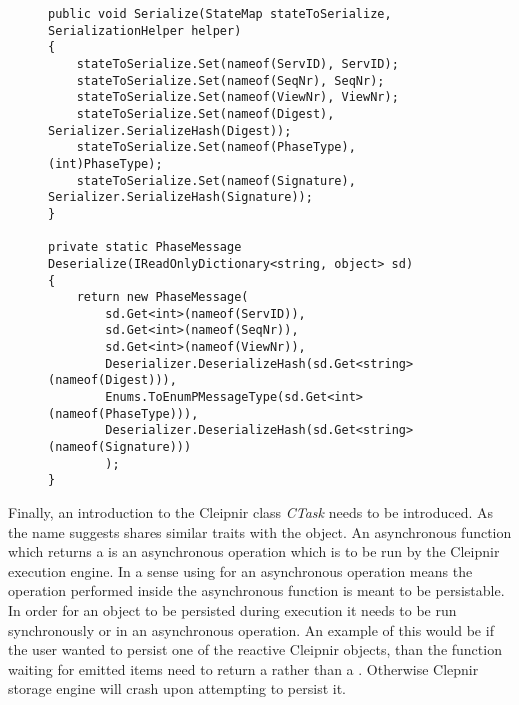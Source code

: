 \begin{figure}[H]
	\centering
	\begin{lstlisting}[label = code:seriadeseria, caption=Serialize/Deserialize code example, captionpos=b, basicstyle=\scriptsize]
public void Serialize(StateMap stateToSerialize, SerializationHelper helper)
{
    stateToSerialize.Set(nameof(ServID), ServID);
    stateToSerialize.Set(nameof(SeqNr), SeqNr);
    stateToSerialize.Set(nameof(ViewNr), ViewNr);
    stateToSerialize.Set(nameof(Digest), Serializer.SerializeHash(Digest));
    stateToSerialize.Set(nameof(PhaseType), (int)PhaseType);
    stateToSerialize.Set(nameof(Signature), Serializer.SerializeHash(Signature));
}

private static PhaseMessage Deserialize(IReadOnlyDictionary<string, object> sd)
{
    return new PhaseMessage(
        sd.Get<int>(nameof(ServID)),
        sd.Get<int>(nameof(SeqNr)),
        sd.Get<int>(nameof(ViewNr)),
        Deserializer.DeserializeHash(sd.Get<string>(nameof(Digest))),
        Enums.ToEnumPMessageType(sd.Get<int>(nameof(PhaseType))),
        Deserializer.DeserializeHash(sd.Get<string>(nameof(Signature)))
        );
}
	\end{lstlisting}
\end{figure}

Finally, an introduction to the Cleipnir class \emph{CTask} needs to be introduced. As the name suggests  shares similar traits with the  object. An asynchronous function which returns a  is an asynchronous operation which is to be run by the Cleipnir execution engine. In a sense using  for an asynchronous operation means the operation performed inside the asynchronous function is meant to be persistable. In order for an object to be persisted during execution it needs to be run synchronously or in an asynchronous  operation. An example of this would be if the user wanted to persist one of the reactive Cleipnir  objects, than the function waiting for emitted items need to return a  rather than a . Otherwise Clepnir storage engine will crash upon attempting to persist it. 

